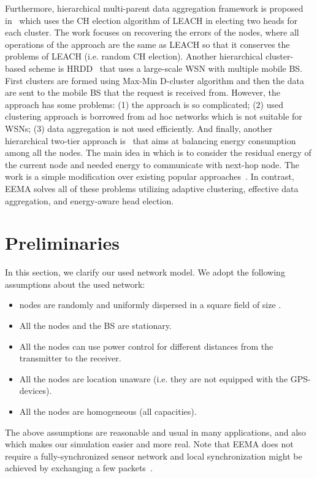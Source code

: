 \documentclass[journal]{IEEEtran}
\begin{document}
Furthermore, hierarchical multi-parent data aggregation framework is proposed in~\cite{alemu2010} which uses the CH election algorithm of LEACH in electing two heads for each cluster.  The work focuses on recovering the errors of the nodes, where all operations of the approach are the same as LEACH so that it conserves the problems of  LEACH (i.e. random CH election).  Another hierarchical cluster-based scheme is HRDD~\cite{HRDD} that uses a large-scale WSN with multiple mobile BS.  First clusters are formed using Max-Min D-cluster algorithm and then the data are sent to the mobile BS that the request is received from.  However, the approach has some problems: (1) the approach is so complicated; (2) used clustering approach is borrowed from ad hoc networks which is not suitable for WSNs; (3) data aggregation is not used efficiently.
And finally, another hierarchical two-tier approach is~\cite{bulgaria2012} that aims at balancing energy consumption among all the nodes.  The main idea in which is to consider the residual energy of the current node and needed energy to communicate with next-hop node.  The work is a simple modification over existing popular approaches~\cite{Heinzelman2002,SEP2004}.  In contrast, EEMA solves all of these problems utilizing adaptive clustering, effective data aggregation, and energy-aware head election.


\section{Preliminaries}
\label{sec:net-mod}
In this section, we clarify our used network model. We adopt the following assumptions about the used network:
\begin{itemize}

\item	 nodes are randomly and uniformly dispersed in a square field of size .
\item	All the nodes and the BS are stationary. 
\item	All the nodes can use power control for different distances from the transmitter to the receiver.
\item	All the nodes are location unaware (i.e. they are not equipped with the GPS-devices). 
\item	All the nodes are homogeneous (all capacities).


\end{itemize}

The above assumptions are reasonable and usual in many applications, and also which makes our simulation easier and more real. Note that EEMA does not require a fully-synchronized sensor network and local synchronization might be achieved by exchanging a few packets~\cite{zhu}.
\end{document}
